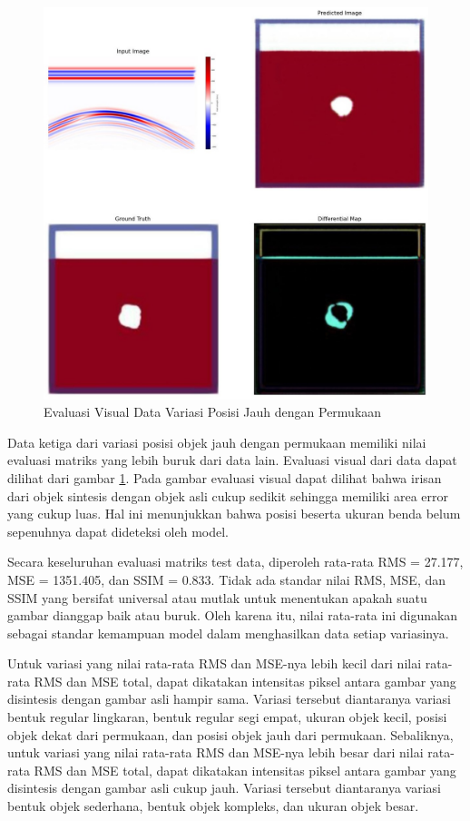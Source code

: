 \documentclass[conference]{IEEEtran}
\begin{document}
\begin{figure}[ht]
  \centering
  \includegraphics[scale=0.15]{gambar/diffMapDalam.jpg}
  \caption{Evaluasi Visual Data Variasi Posisi Jauh dengan Permukaan}
  \label{fig:diffmapdalam}
\end{figure}

Data ketiga dari variasi posisi objek jauh dengan permukaan memiliki nilai evaluasi matriks yang lebih buruk dari data lain. 
Evaluasi visual dari data dapat dilihat dari gambar \ref{fig:diffmapdalam}. 
Pada gambar evaluasi visual dapat dilihat bahwa irisan dari objek sintesis dengan objek asli cukup sedikit sehingga memiliki area error yang cukup luas. 
Hal ini menunjukkan bahwa posisi beserta ukuran benda belum sepenuhnya dapat dideteksi oleh model.  

Secara keseluruhan evaluasi matriks test data, diperoleh rata-rata RMS = 27.177, MSE = 1351.405, dan SSIM = 0.833. 
Tidak ada standar nilai RMS, MSE, dan SSIM yang bersifat universal atau mutlak untuk menentukan apakah suatu gambar dianggap baik atau buruk. 
Oleh karena itu, nilai rata-rata ini digunakan sebagai standar kemampuan model dalam menghasilkan data setiap variasinya.

Untuk variasi yang nilai rata-rata RMS dan MSE-nya lebih kecil dari nilai rata-rata RMS dan MSE total, dapat dikatakan intensitas piksel antara gambar yang disintesis dengan gambar asli hampir sama. 
Variasi tersebut diantaranya variasi bentuk regular lingkaran, bentuk regular segi empat, ukuran objek kecil, posisi objek dekat dari permukaan, dan posisi objek jauh dari permukaan. 
Sebaliknya, untuk variasi yang nilai rata-rata RMS dan MSE-nya lebih besar dari nilai rata-rata RMS dan MSE total, dapat dikatakan intensitas piksel antara gambar yang disintesis dengan gambar asli cukup jauh. 
Variasi tersebut diantaranya variasi bentuk objek sederhana, bentuk objek kompleks, dan ukuran objek besar.
\end{document}
